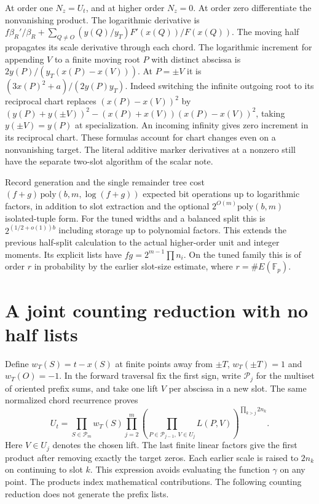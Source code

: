 \documentclass[11pt]{article}
\newcommand{\F}{\mathbb F}
\begin{document}
At order one $N_z=U_t$, and at higher order $N_z=0$. At order zero
differentiate the nonvanishing product. The logarithmic derivative
is $f\beta_R'/\beta_R+\sum_{Q\ne O}(y(Q)/y_T)F'(x(Q))/F(x(Q))$.
The moving half propagates its scale derivative through each chord.
The logarithmic increment for appending $V$ to a finite moving
root $P$ with distinct abscissa is
$2y(P)/(y_T(x(P)-x(V)))$. At $P=\pm V$ it is
$(3x(P)^2+a)/(2y(P)y_T)$.
Indeed switching the infinite outgoing root to its reciprocal chart
replaces $(x(P)-x(V))^2$ by
$(y(P)+y(\pm V))^2-(x(P)+x(V))(x(P)-x(V))^2$, taking
$y(\pm V)=y(P)$ at specialization. An incoming infinity gives
zero increment in its reciprocal chart. These formulas account
for chart changes even on a nonvanishing target. The literal
additive marker derivatives at a nonzero still have the separate
two-slot algorithm of the scalar note.

Record generation and the single remainder tree cost
$(f+g)\,\mathrm{poly}(b,m,\log(f+g))$ expected bit operations up
to logarithmic factors, in addition to slot extraction and the
optional $2^{O(m)}\mathrm{poly}(b,m)$ isolated-tuple form.
For the tuned widths and a balanced split this is
$2^{(1/2+o(1))b}$ including storage up to polynomial factors.
This extends the previous half-split calculation to the actual
higher-order unit and integer moments. Its explicit lists have
$fg=2^{m-1}\prod n_i$. On the tuned family this is of order $r$ in
probability by the earlier slot-size estimate, where $r=\#E(\F_p)$.

\section{A joint counting reduction with no half lists}
Define $w_T(S)=t-x(S)$ at finite points away from $\pm T$,
$w_T(\pm T)=1$ and $w_T(O)=-1$. In the forward traversal fix
the first sign, write $\mathcal P_j$ for the multiset of oriented
prefix sums, and take one lift $V$ per abscissa in a new slot.
The same normalized chord recurrence proves
\[
 U_t=\prod_{S\in\mathcal P_m}w_T(S)
       \prod_{j=2}^m
       \left(\prod_{P\in\mathcal P_{j-1},\,V\in U_j}
              L(P,V)\right)^{\prod_{k>j}2n_k}.
\]
Here $V\in U_j$ denotes the chosen lift. The last finite linear
factors give the first product after removing exactly the target
zeros. Each earlier scale is raised to $2n_k$ on continuing to
slot $k$. This expression avoids evaluating the function
$\gamma$ on any point. The products index mathematical
contributions. The following counting reduction does not generate
the prefix lists.
\end{document}
